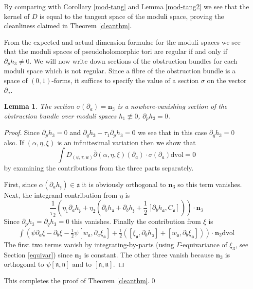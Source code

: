 \documentclass[11pt]{amsart}
\newcommand{\dbar}{\overline{\partial}}
\newcommand{\dvol}{\mathrm{dvol}}
\newcommand{\nn}{\mathfrak{n}}
\renewcommand{\aa}{\mathfrak{a}}
\newcommand{\zz}{\mathfrak{z}}
\numberwithin{equation}{section}
\newtheorem{lma}[equation]{Lemma}
\theoremstyle{definition}
\theoremstyle{remark}
\begin{document}
By comparing with Corollary \ref{mod-tang} and Lemma \ref{mod-tang2} we see that the kernel of $D$ is equal to the tangent space of the moduli space, proving the cleanliness claimed in Theorem \ref{cleanthm}.

From the expected and actual dimension formulae for the moduli spaces we see that the moduli spaces of pseudoholomorphic tori are regular if and only if $\partial_ph_3\neq 0$. We will now write down sections of the obstruction bundles for each moduli space which is not regular. Since a fibre of the obstruction bundle is a space of $(0,1)$-forms, it suffices to specify the value of a section $\sigma$ on the vector $\partial_a$.
\begin{lma}\label{obscalc}
The section $\sigma(\partial_a)=\mathbf{n}_3$ is a nowhere-vanishing section of the obstruction bundle over moduli spaces $h_1\not\equiv 0$, $\partial_ph_3=0$.
\end{lma}
\begin{proof}
Since $\partial_ph_3=0$ and $\partial_qh_3-\tau_1\partial_ph_3=0$ we see that in this case $\partial_qh_3=0$ also. If $(\alpha,\eta,\xi)$ is an infinitesimal variation then we show that
\[\int D_{(\psi,\tau,w)}\dbar(\alpha,\eta,\xi)(\partial_a)\cdot\sigma(\partial_a)\dvol=0\]
by examining the contributions from the three parts separately.

First, since $\alpha(\partial_ah_{\zz})\in\aa$ it is obviously orthogonal to $\mathbf{n}_3$ so this term vanishes. Next, the integrand contribution from $\eta$ is
\[\frac{1}{\tau_2}\left(\eta_1\partial_ah_{\zz}+\eta_2\left(\partial_bh_{\aa}+\partial_bh_{\zz}+\frac{1}{2}[\partial_bh_{\aa},C_{\aa}]\right)\right)\cdot \mathbf{n}_3\]
Since $\partial_ph_3=\partial_qh_3=0$ this vanishes. Finally the contribution from $\xi$ is
\begin{align*}
\int\left(\psi\partial_a\xi-\partial_b\xi-\frac{1}{2}\psi[w_{\aa},\partial_a\xi_{\aa}]+\frac{1}{2}\left([\xi_{\aa},\partial_bh_{\aa}]+[w_{\aa},\partial_b\xi_{\aa}]\right)\right)\cdot \mathbf{n}_3\dvol
\end{align*}
The first two terms vanish by integrating-by-parts (using $\Gamma$-equivariance of $\xi_3$, see Section \ref{equivar}) since $\mathbf{n}_3$ is constant. The other three vanish because $\mathbf{n}_3$ is orthogonal to $\psi[\nn,\nn]$ and to $[\nn,\nn]$.
\end{proof}

This completes the proof of Theorem \ref{cleanthm}.\qed

\end{document}
